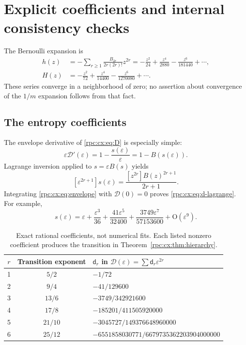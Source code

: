 \documentclass[11pt]{article}
\theoremstyle{definition}
\theoremstyle{remark}
\numberwithin{equation}{section}
\begin{document}
\section{Explicit coefficients and internal consistency checks}
\label{rpc:cx:sec:coeff}
The Bernoulli expansion is
\begin{align}
 h(z)&=-\sum_{r\ge1}\frac{B_{2r}}{2r(2r)!}z^{2r}
       =-\frac{z^2}{24}+\frac{z^4}{2880}
           -\frac{z^6}{181440}+\cdots,\label{rpc:cx:eq:hseries}\\
 H(z)&=-\frac{z^2}{72}+\frac{z^4}{14400}
           -\frac{z^6}{1270080}+\cdots.
\end{align}
These series converge in a neighborhood of zero; no assertion about
convergence of the $1/m$ expansion follows from that fact.

\subsection{The entropy coefficients}
The envelope derivative of \eqref{rpc:cx:eq:D} is especially simple:
\begin{equation}\label{rpc:cx:eq:envelope}
 \varepsilon \mathcal D'(\varepsilon)=1-\frac{s(\varepsilon)}\varepsilon=1-B(s(\varepsilon)).
\end{equation}
Lagrange inversion applied to $s=\varepsilon B(s)$ yields
\begin{equation}\label{rpc:cx:eq:s-lagrange}
 [\varepsilon^{2r+1}]s(\varepsilon)
       =\frac{[z^{2r}]B(z)^{2r+1}}{2r+1}.
\end{equation}
Integrating \eqref{rpc:cx:eq:envelope} with $\mathcal D(0)=0$ proves
\eqref{rpc:cx:eq:d-lagrange}. For example,
\begin{equation}
 s(\varepsilon)=\varepsilon+\frac{\varepsilon^3}{36}
 +\frac{41\varepsilon^5}{32400}
 +\frac{3749\varepsilon^7}{57153600}+\mathrm O(\varepsilon^9).
\end{equation}

\begin{table}[ht]
\centering
\renewcommand{\arraystretch}{1.35}
\begin{tabular}{ccl}
\toprule
$r$ & Transition exponent & $\mathsf d_r$ in $\mathcal D(\varepsilon)=\sum \mathsf d_r\varepsilon^{2r}$\\
\midrule
1 & $5/2$ & $-1/72$\\
2 & $9/4$ & $-41/129600$\\
3 & $13/6$ & $-3749/342921600$\\
4 & $17/8$ & $-185201/411505920000$\\
5 & $21/10$ & $-3045727/149376648960000$\\
6 & $25/12$ & $-6551858030771/6679735362203904000000$\\
\bottomrule
\end{tabular}
\caption{Exact rational coefficients, not numerical fits. Each listed
nonzero coefficient produces the transition in
Theorem~\ref{rpc:cx:thm:hierarchy}.}\label{rpc:cx:tab:coefficients}
\end{table}
\end{document}
